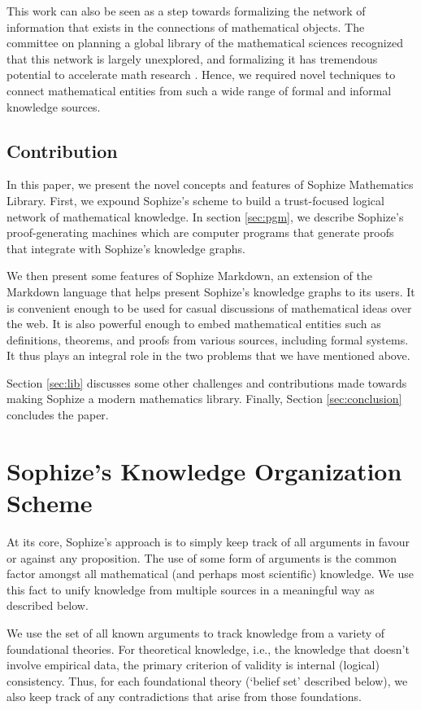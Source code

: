 \documentclass[runningheads]{llncs}
\begin{document}
This work can also be seen as a step towards formalizing the network of information that exists in the connections of mathematical objects. The committee on planning a global library of the mathematical sciences recognized that this network is largely unexplored, and formalizing it has tremendous potential to accelerate math research \cite{sciences2014developing}. Hence, we required novel techniques to connect mathematical entities from such a wide range of formal and informal knowledge sources.

\subsection{Contribution}
In this paper, we present the novel concepts and features of Sophize Mathematics Library. First, we expound Sophize's scheme to build a trust-focused logical network of mathematical knowledge. In section \ref{sec:pgm}, we describe Sophize's proof-generating machines which are computer programs that generate proofs that integrate with Sophize's knowledge graphs.

We then present some features of Sophize Markdown, an extension of the Markdown language that helps present Sophize's knowledge graphs to its users. It is convenient enough to be used for casual discussions of mathematical ideas over the web. It is also powerful enough to embed mathematical entities such as definitions, theorems, and proofs from various sources, including formal systems. It thus plays an integral role in the two problems that we have mentioned above.

Section \ref{sec:lib} discusses some other challenges and contributions made towards making Sophize a modern mathematics library. Finally, Section \ref{sec:conclusion} concludes the paper.


\section{Sophize's Knowledge Organization Scheme}
At its core, Sophize's approach is to simply keep track of all arguments in favour or against any proposition. The use of some form of arguments is the common factor amongst all mathematical (and perhaps most scientific) knowledge. We use this fact to unify knowledge from multiple sources in a meaningful way as described below.

We use the set of all known arguments to track knowledge from a variety of foundational theories. For theoretical knowledge, i.e., the knowledge that doesn't involve empirical data, the primary criterion of validity is internal (logical) consistency. Thus, for each foundational theory (`belief set' described below), we also keep track of any contradictions that arise from those foundations.
\end{document}
